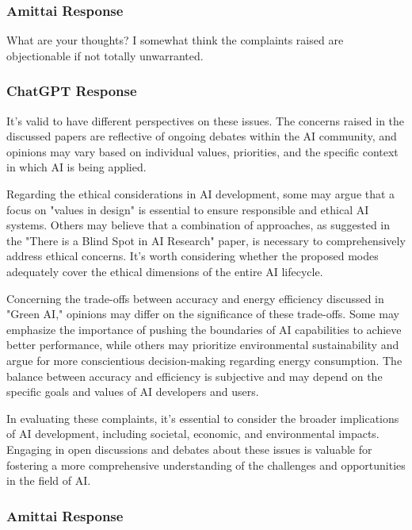 \subsubsection{Amittai Response}

What are your thoughts? I somewhat think the complaints raised are objectionable if not totally unwarranted.

\subsubsection{ChatGPT Response}

It's valid to have different perspectives on these issues. The concerns raised in the discussed papers are reflective of ongoing debates within the AI community, and opinions may vary based on individual values, priorities, and the specific context in which AI is being applied.

Regarding the ethical considerations in AI development, some may argue that a focus on "values in design" is essential to ensure responsible and ethical AI systems. Others may believe that a combination of approaches, as suggested in the "There is a Blind Spot in AI Research" paper, is necessary to comprehensively address ethical concerns. It's worth considering whether the proposed modes adequately cover the ethical dimensions of the entire AI lifecycle.

Concerning the trade-offs between accuracy and energy efficiency discussed in "Green AI," opinions may differ on the significance of these trade-offs. Some may emphasize the importance of pushing the boundaries of AI capabilities to achieve better performance, while others may prioritize environmental sustainability and argue for more conscientious decision-making regarding energy consumption. The balance between accuracy and efficiency is subjective and may depend on the specific goals and values of AI developers and users.

In evaluating these complaints, it's essential to consider the broader implications of AI development, including societal, economic, and environmental impacts. Engaging in open discussions and debates about these issues is valuable for fostering a more comprehensive understanding of the challenges and opportunities in the field of AI.

\subsubsection{Amittai Response}


